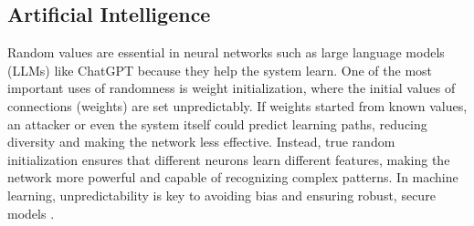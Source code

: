 \subsection{Artificial Intelligence}\label{sec:applications_security}
Random values are essential in neural networks such as large language models (LLMs) like ChatGPT because they help the system learn. One of the most important uses of randomness is weight initialization, where the initial values of connections (weights) are set unpredictably. If weights started from known values, an attacker or even the system itself could predict learning paths, reducing diversity and making the network less effective. Instead, true random initialization ensures that different neurons learn different features, making the network more powerful and capable of recognizing complex patterns. In machine learning, unpredictability is key to avoiding bias and ensuring robust, secure models \cite{pmlr-v9-glorot10a}.
